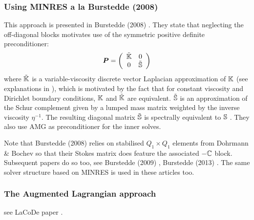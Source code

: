 \subsubsection{Using MINRES a la Burstedde \etal (2008)}

This approach is presented in Burstedde \etal (2008) \cite{bugg08}.
They state that neglecting the off-diagonal blocks motivates use of the symmetric
positive definite preconditioner:
\[
{\bm P} = \left(
\begin{array}{cc}
\tilde{{\mathbb{K}}} & 0 \\
0 & \tilde{{\mathbb{S}}}
\end{array}
\right)
\]
where $\tilde{{\mathbb{K}}}$ is a variable-viscosity discrete vector Laplacian
approximation of ${\mathbb{K}}$ (see explanations in \cite{bugs09}), 
which is motivated by the fact that
for constant viscosity and Dirichlet boundary conditions,
${\mathbb{K}}$ and $\tilde{{\mathbb{K}}}$ are equivalent. 
$\tilde{{\mathbb{S}}}$ is an approximation of
the Schur complement given by a lumped mass matrix
weighted by the inverse viscosity $\eta^{-1}$. The resulting
diagonal matrix $\tilde{{\mathbb{S}}}$ is spectrally equivalent to ${\mathbb{S}}$ \cite{elsw}.
They also use AMG as preconditioner for the inner solves. 

Note that Burstedde \etal  (2008) \cite{bugg08} relies on stabilised 
$Q_1\times Q_1$ elements from Dohrmann \& Bochev \cite{dobo04} 
so that their Stokes matrix does feature the associated $-{\mathbb{C}}$ block.
Subsequent papers do so too, see Burstedde \etal (2009) \cite{bugs09}, 
Burstedde \etal (2013) \cite{busa13}.
The same solver structure based on MINRES is used in these articles too.

\subsubsection{The Augmented Lagrangian approach}

see LaCoDe paper \cite{demh19}.

